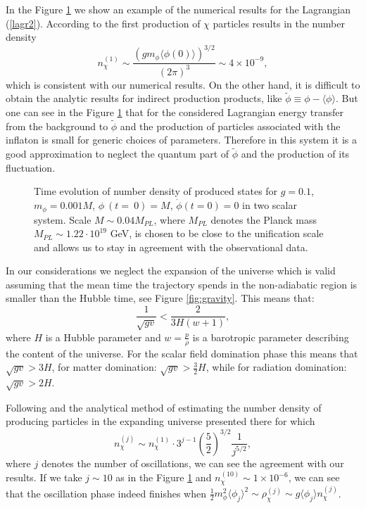 \documentclass[twocolumn,showpacs,preprintnumbers,amsmath,amssymb,nofootinbib,superscriptaddress,prc]{revtex4}
\begin{document}
In the Figure \ref{fig:two} we show an example of the numerical results for the Lagrangian (\ref{lagr2}). According to \cite{Kofman:2004yc} the first production of $\chi$ particles results in the number density
\begin{equation}
 n^{(1)}_\chi \sim \frac{(gm_\phi\langle\phi(0)\rangle)^{3/2}}{(2\pi)^3}\sim4\times10^{-9},
\end{equation}
which is consistent with our numerical results. On the other hand, it is difficult to obtain the analytic results for indirect production products, like $\tilde{\phi}\equiv\phi-\langle\phi\rangle$. But one can see in the Figure \ref{fig:two} that for the considered Lagrangian energy transfer from the background to $\tilde{\phi} $ and the production of particles associated with the inflaton is small for generic choices of parameters. Therefore in this system it is a good approximation to neglect the quantum part of $\tilde{\phi}$ and the production of its fluctuation.

\begin{figure}[h!]
\begin{center}
\caption{Time evolution of number density of produced states for $g=0.1$, $m_\phi=0.001 M$, $\phi~(t=~0)=M$, $\dot{\phi}(t=0)=0$ in two scalar system. Scale $M \sim 0.04 M_{PL}$, where $M_{PL}$ denotes the Planck mass $M_{PL} \sim 1.22 \cdot 10^{19}$ GeV, is chosen to be close to the unification scale and allows us to stay in agreement with the observational data.} \label{fig:two}
\end{center}
\end{figure}

In our considerations we neglect the expansion of the universe which is valid assuming that the mean time the trajectory spends in the non-adiabatic region is smaller than the Hubble time, see Figure \ref{fig:gravity}. This means that:
\begin{equation}
\frac{1}{\sqrt{gv}} < \frac{2}{3 H (w+1)},
\end{equation}
where $H$ is a Hubble parameter and $w = \frac{p}{\rho}$ is a barotropic parameter describing the content of the universe. For the scalar field domination phase this means that $\sqrt{gv} > 3 H $, for matter domination: $ \sqrt{gv} > \frac{3}{2} H$, while for radiation domination: $\sqrt{gv} > 2 H$. 

Following \cite{Enqvist:2012tc} and the analytical method of estimating the number density of producing particles in the expanding universe presented there for which
\begin{equation}
 n^{(j)}_\chi \sim n^{(1)}_\chi \cdot 3^{j-1} \left( \frac{5}{2} \right)^{3/2}\frac{1}{j^{5/2}},
\end{equation}
where $j$ denotes the number of oscillations, we can see the agreement with our results. If we take $j\sim10$ as in the Figure \ref{fig:two} and $n_\chi^{(10)}\sim1\times10^{-6}$, we can see that the oscillation phase indeed finishes when $\frac{1}{2}m_\phi^2\langle\phi_j\rangle^2\sim \rho_\chi^{(j)}\sim g\langle\phi_j\rangle n_\chi^{(j)}$. 
\end{document}
